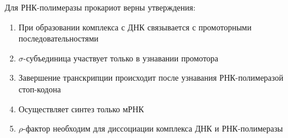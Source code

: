 
Для РНК-полимеразы прокариот верны утверждения:

\begin{enumerate}
    \item При образовании комплекса с ДНК связывается с промоторными последовательностями
    \item $\sigma$-субъединица участвует только в узнавании промотора
    \item Завершение транскрипции происходит после узнавания РНК-полимеразой стоп-кодона
    \item Осуществляет синтез только мРНК
    \item $\rho$-фактор необходим для диссоциации комплекса ДНК и РНК-полимеразы
\end{enumerate}



